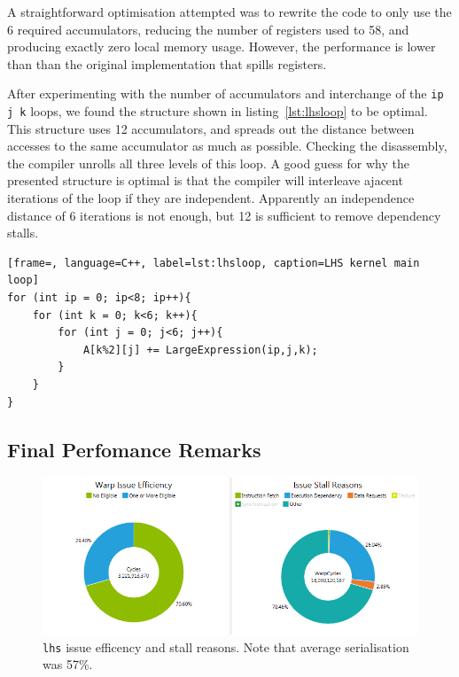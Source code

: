 \documentclass[11pt, oneside, a4paper]{article}
\begin{document}
A straightforward optimisation attempted was to rewrite the code to only use the 6 required accumulators, reducing the number of registers used to 58, and producing exactly zero local memory usage. However, the performance is lower than than the original implementation that spills registers.

After experimenting with the number of accumulators and interchange of the \verb.ip j k. loops, we found the structure shown in listing~\ref{lst:lhsloop} to be optimal. This structure uses 12 accumulators, and spreads out the distance between accesses to the same accumulator as much as possible. Checking the disassembly, the compiler unrolls all three levels of this loop. A good guess for why the presented structure is optimal is that the compiler will interleave ajacent iterations of the loop if they are independent. Apparently an independence distance of 6 iterations is not enough, but 12 is sufficient to remove dependency stalls.

\begin{lstlisting}[frame=, language=C++, label=lst:lhsloop, caption=LHS kernel main loop]
for (int ip = 0; ip<8; ip++){
	for (int k = 0; k<6; k++){
		for (int j = 0; j<6; j++){
			A[k%2][j] += LargeExpression(ip,j,k);
		}
	}
}
\end{lstlisting}


\subsection{Final Perfomance Remarks} %
\label{sub:final_performance_remarks}

\begin{figure}[tb]
	\begin{center}
		\includegraphics[width=\textwidth]{"LHS efficency and stall reason"}
	\end{center}
	\caption{\texttt{lhs} issue efficency and stall reasons. Note that average serialisation was 57\%.}
	\label{fig:issue_eff_and_stall_reasons}
\end{figure}
\end{document}
